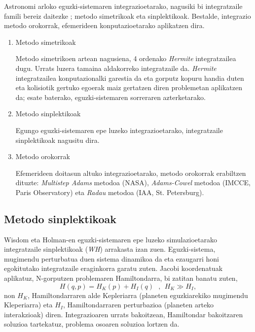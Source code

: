 Astronomi arloko eguzki-sistemaren integrazioetarako, nagusiki bi integratzaile famili bereiz daitezke \cite{Ito2007}; metodo simetrikoak eta sinplektikoak. Bestalde, integrazio metodo orokorrak, efemerideen konputazioetarako aplikatzen dira. 
\begin{enumerate}
\item Metodo simetrikoak

Metodo simetrikoen artean nagusiena, 4 ordenako \emph{Hermite}  integratzailea \cite{Aarseth2008} dugu.
Urrats luzera tamaina aldakorreko integratzaile da.  \emph{Hermite} integratzailea konputazionalki garestia da eta gorputz kopuru handia duten eta kolisiotik gertuko egoerak maiz gertatzen diren problemetan aplikatzen da; esate baterako, eguzki-sistemaren sorreraren azterketarako.  

\item Metodo sinplektikoak

Egungo eguzki-sistemaren epe luzeko integrazioetarako, integratzaile sinplektikoak nagusitu dira. 

\item Metodo orokorrak

Efemerideen doitasun altuko integrazioetarako, metodo orokorrak erabiltzen dituzte: \emph{Multistep Adams} metodoa (NASA), \emph{Adams-Cowel} metodoa (IMCCE, Paris Observatory) eta \emph{Radau} metodoa (IAA, St. Petersburg). 

\end{enumerate}


\subsection*{Metodo sinplektikoak}

Wisdom eta Holman-en \cite[1991]{Sussman1992} eguzki-sistemaren epe luzeko simulazioetarako integratzaile  sinplektikoak (\emph{WH}) arrakasta izan zuen. Eguzki-sistema, mugimendu perturbatua duen sistema dinamikoa da eta ezaugarri honi egokitutako integratzaile eraginkorra garatu zuten. Jacobi koordenatuak  aplikatuz, N-gorputzen problemaren Hamiltondarra, bi zatitan banatu zuten,
\begin{equation*}
H(q,p)=H_K(p)+H_I(q) \ \ \ , \ \ H_K\gg H_I,
\end{equation*}
non $H_K$, Hamiltondarraren alde Kepleriarra (planeten eguzkiarekiko mugimendu Kleperiarra) eta $H_I$, Hamiltondarraren perturbazioa (planeten arteko interakzioak) diren. Integrazioaren urrats bakoitzean, Hamiltondar bakoitzaren soluzioa tartekatuz, problema osoaren soluzioa lortzen da.  

